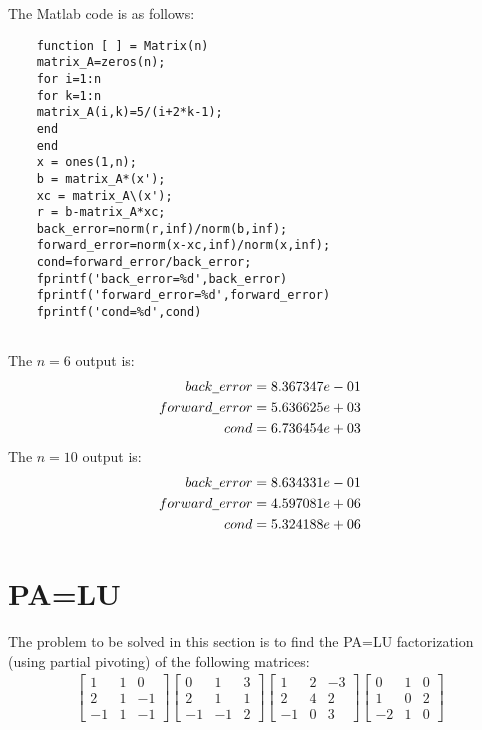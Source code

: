 \documentclass[UTF8]{ctexart}
\begin{document}
The Matlab code is as follows:

\begin{centering}
	\begin{lstlisting}
	function [ ] = Matrix(n)
	matrix_A=zeros(n);
	for i=1:n
	for k=1:n
	matrix_A(i,k)=5/(i+2*k-1);
	end
	end
	x = ones(1,n);
	b = matrix_A*(x');
	xc = matrix_A\(x');
	r = b-matrix_A*xc;
	back_error=norm(r,inf)/norm(b,inf);
	forward_error=norm(x-xc,inf)/norm(x,inf);
	cond=forward_error/back_error;
	fprintf('back_error=%d',back_error)
	fprintf('forward_error=%d',forward_error)
	fprintf('cond=%d',cond)
	
	\end{lstlisting}
\end{centering}
The $n=6$ output is:
\begin{align*}
back\underline{\hspace{0.5em}}error&=8.367347e-01\\
forward \underline{\hspace{0.5em}} error&=5.636625e+03\\
cond&=6.736454e+03
\end{align*}
The $n=10$ output is:
\begin{align*}
back\underline{\hspace{0.5em}} error&=8.634331e-01\\
forward \underline{\hspace{0.5em}} error&=4.597081e+06\\
cond&=5.324188e+06\end{align*}
\section{PA=LU}
The problem to be solved in this section is to find the PA=LU factorization (using partial pivoting) of the following matrices:
$$
\begin{gathered}
\begin{bmatrix}1 & 1 & 0\\2 &1&-1\\-1& 1 & -1
\end{bmatrix}
\begin{bmatrix}0 & 1 &3\\2 &1&1\\-1& -1& 2
\end{bmatrix}
\begin{bmatrix}1 & 2 & -3\\2 &4&2\\-1& 0 & 3
\end{bmatrix}
\begin{bmatrix}0 & 1 &0\\1 &0&2\\-2& 1& 0
\end{bmatrix}
\end{gathered}
$$
\end{document}
